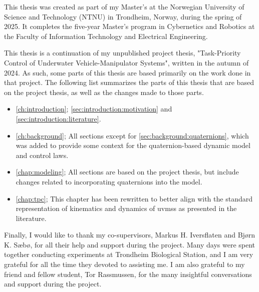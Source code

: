 This thesis was created as part of my Master's at the Norwegian University of Science and Technology (NTNU) in Trondheim, Norway, during the spring of 2025. It completes the five-year Master's program in Cybernetics and Robotics at the Faculty of Information Technology and Electrical Engineering.

This thesis is a continuation of my unpublished project thesis, "Task-Priority Control of Underwater Vehicle-Manipulator Systems", written in the autumn of 2024. As such, some parts of this thesis are based primarily on the work done in that project. The following list
summarizes the parts of this thesis that are based on the project thesis, as well as the changes made to those parts.

\begin{itemize}
    \item \autoref{ch:introduction}; \autoref{sec:introduction:motivation} and \autoref{sec:introduction:literature}.
    \item \autoref{ch:background}; All sections except for \autoref{sec:background:quaternions}, which was added to provide some context for the quaternion-based dynamic model and control laws.
    \item \autoref{chap:modeling}; All sections are based on the project thesis, but include changes related to incorporating quaternions into the model.
    \item \autoref{chap:tpc}; This chapter has been rewritten to better align with the standard representation of kinematics and dynamics of \gls{uvms}s as presented in the literature.
\end{itemize}

Finally, I would like to thank my co-supervisors, Markus H. Iversflaten and Bjørn K. Sæbø, for all their help and support during the project. Many days were spent together conducting experiments at Trondheim Biological Station, and I am very grateful for all the time they devoted to assisting me. I am also grateful to my friend and fellow student, Tor Rassmussen, for the many insightful conversations and support during the project.
